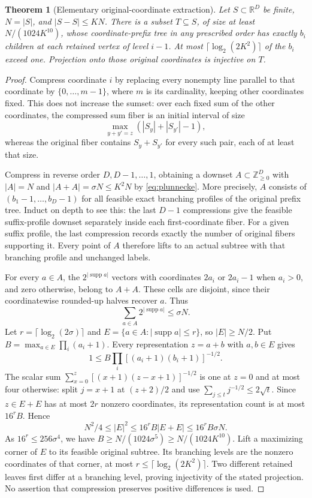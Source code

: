 \documentclass[11pt]{amsart}
\newtheorem{theorem}{Theorem}[section]
\theoremstyle{definition}
\theoremstyle{remark}
\newcommand{\R}{\mathbb{R}}
\newcommand{\Z}{\mathbb{Z}}
\begin{document}
\begin{theorem}[Elementary original-coordinate extraction]\label{thm:elementary-extraction}
Let $S\subset\R^D$ be finite, $N=|S|$, and $|S-S|\le KN$. There is a subset $T\subseteq S$, of size at least $N/(1024K^{10})$, whose coordinate-prefix tree in any prescribed order has exactly $b_i$ children at each retained vertex of level $i-1$. At most $\lceil\log_2(2K^2)\rceil$ of the $b_i$ exceed one. Projection onto those original coordinates is injective on $T$.
\end{theorem}
\begin{proof}
Compress coordinate $i$ by replacing every nonempty line parallel to that coordinate by $\{0,\ldots,m-1\}$, where $m$ is its cardinality, keeping other coordinates fixed. This does not increase the sumset: over each fixed sum of the other coordinates, the compressed sum fiber is an initial interval of size
\[
\max_{y+y'=z}(|S_y|+|S_{y'}|-1),
\]
whereas the original fiber contains $S_y+S_{y'}$ for every such pair, each of at least that size.

Compress in reverse order $D,D-1,\ldots,1$, obtaining a downset $A\subset\Z_{\ge0}^D$ with $|A|=N$ and $|A+A|=\sigma N\le K^2N$ by \eqref{eq:plunnecke}. More precisely, $A$ consists of $(b_1-1,\ldots,b_D-1)$ for all feasible exact branching profiles of the original prefix tree. Induct on depth to see this: the last $D-1$ compressions give the feasible suffix-profile downset separately inside each first-coordinate fiber. For a given suffix profile, the last compression records exactly the number of original fibers supporting it. Every point of $A$ therefore lifts to an actual subtree with that branching profile and unchanged labels.

For every $a\in A$, the $2^{|\operatorname{supp}a|}$ vectors with coordinates $2a_i$ or $2a_i-1$ when $a_i>0$, and zero otherwise, belong to $A+A$. These cells are disjoint, since their coordinatewise rounded-up halves recover $a$. Thus
\[
\sum_{a\in A}2^{|\operatorname{supp}a|}\le\sigma N.
\]
Let $r=\lceil\log_2(2\sigma)\rceil$ and $E=\{a\in A:|\operatorname{supp}a|\le r\}$, so $|E|\ge N/2$. Put $B=\max_{a\in E}\prod_i(a_i+1)$. Every representation $z=a+b$ with $a,b\in E$ gives
\[
1\le B\prod_i[(a_i+1)(b_i+1)]^{-1/2}.
\]
The scalar sum $\sum_{x=0}^z[(x+1)(z-x+1)]^{-1/2}$ is one at $z=0$ and at most four otherwise: split $j=x+1$ at $(z+2)/2$ and use $\sum_{j\le t}j^{-1/2}\le2\sqrt t$. Since $z\in E+E$ has at most $2r$ nonzero coordinates, its representation count is at most $16^rB$. Hence
\[
N^2/4\le|E|^2\le16^rB|E+E|\le16^rB\sigma N.
\]
As $16^r\le256\sigma^4$, we have $B\ge N/(1024\sigma^5)\ge N/(1024K^{10})$. Lift a maximizing corner of $E$ to its feasible original subtree. Its branching levels are the nonzero coordinates of that corner, at most $r\le\lceil\log_2(2K^2)\rceil$. Two different retained leaves first differ at a branching level, proving injectivity of the stated projection. No assertion that compression preserves positive differences is used.
\end{proof}
\end{document}
